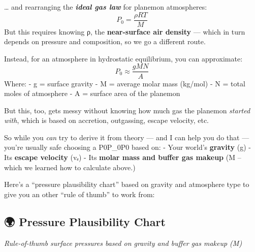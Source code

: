 \documentclass[
  letterpaper,
]{book}
\begin{document}
\ldots{} and rearranging the \textbf{\emph{ideal gas law}} for planemon
atmospheres: \[
P_0 = \dfrac{\rho R T}{M}
\] But this requires knowing ρ, the \textbf{near-surface air density}
--- which in turn depends on pressure and composition, so we go a
different route.

Instead, for an atmosphere in hydrostatic equilibrium, you can
approximate: \[
P_0 ≈ \dfrac{g M N}{A}
\] Where: - g = surface gravity - M = average molar mass (kg/mol) - N =
total moles of atmosphere - A = surface area of the planemon

But this, too, gets messy without knowing how much gas the planemon
\emph{started with}, which is based on accretion, outgassing, escape
velocity, etc.

So while you \emph{can} try to derive it from theory --- and I can help
you do that --- you're usually safe choosing a P0P\_0P0\hspace{0pt}
based on: - Your world's \textbf{gravity} (g) - Its \textbf{escape
velocity} (vₑ) - Its \textbf{molar mass and buffer gas makeup} (M --
which we learned how to calculate above.)

Here's a ``pressure plausibility chart'' based on gravity and atmosphere
type to give you an other ``rule of thumb'' to work from:

\subsection{🌍 Pressure Plausibility
Chart}\label{pressure-plausibility-chart}

\emph{Rule-of-thumb surface pressures based on gravity and buffer gas
makeup (M)}
\end{document}
